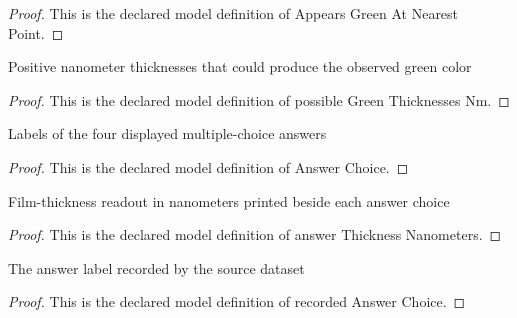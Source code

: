 \begin{proof}
  This is the declared model definition of Appears Green At Nearest Point.
\end{proof}
\begin{definition}
  \label{def:physics:phyx-mini-0127:phyxminiproblems-problemphyxmini0127-possiblegreenthicknessesnm}
  Positive nanometer thicknesses that could produce the observed green color
\end{definition}
\begin{proof}
  This is the declared model definition of possible Green Thicknesses Nm.
\end{proof}
\begin{definition}
  \label{def:physics:phyx-mini-0127:phyxminiproblems-problemphyxmini0127-answerchoice}
  Labels of the four displayed multiple-choice answers
\end{definition}
\begin{proof}
  This is the declared model definition of Answer Choice.
\end{proof}
\begin{definition}
  \label{def:physics:phyx-mini-0127:phyxminiproblems-problemphyxmini0127-answerthicknessnanometers}
  Film-thickness readout in nanometers printed beside each answer choice
\end{definition}
\begin{proof}
  This is the declared model definition of answer Thickness Nanometers.
\end{proof}
\begin{definition}
  \label{def:physics:phyx-mini-0127:phyxminiproblems-problemphyxmini0127-recordedanswerchoice}
  The answer label recorded by the source dataset
\end{definition}
\begin{proof}
  This is the declared model definition of recorded Answer Choice.
\end{proof}
